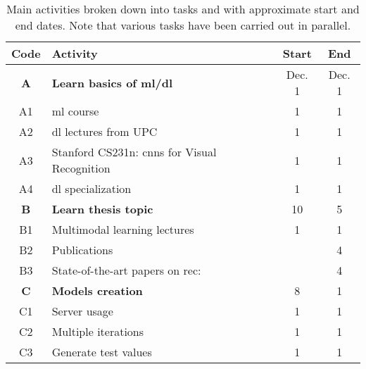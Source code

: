 \begin{table}[p]
  \centering
  \caption[Main activities broken down into tasks]{Main activities broken down
    into tasks and with approximate start and end dates. Note that various
    tasks have been carried out in parallel.}\label{tab:activities}
  \begin{tabular}{cp{}cc}
    \toprule
    \rowcolor{gray!37.5}
    \textbf{Code} & \textbf{Activity} & \textbf{Start} & \textbf{End} \\
    \midrule

    \rowcolor{rowColor}
    \textbf{A} & \textbf{Learn basics of \acs{ml}/\acs{dl}}                                      & Dec. 1 & Dec. 1 \\
    \rowcolor{rowColor}
    A1         & \Acs{ml} course \cite{ng20:machin_learn}                                        & 1      & 1      \\
    \rowcolor{rowColor}
    A2         & \Acs{dl} lectures from UPC \cite{giro-i-nieto20:all_deep_learn_upc_etset_telec} & 1      & 1      \\
    \rowcolor{rowColor}
    A3         & Stanford CS231n: \acsp{cnn} for Visual Recognition \cite{li20:cs231}            & 1      & 1      \\
    \rowcolor{rowColor}
    A4         & \Acs{dl} specialization \cite{ng20:deep_learn_special}                          & 1      & 1      \\
    \midrule

    \textbf{B} & \textbf{Learn thesis topic}                                                       & 10 & 5 \\
    B1         & Multimodal learning lectures \cite{giro-i-nieto20:all_deep_learn_upc_etset_telec} & 1  & 1 \\
    B2         & Publications                                                                      &    & 4 \\
    B3         & State-of-the-art papers on \acs{rec}: \cite{}                                     &    & 4 \\
    \midrule

    \rowcolor{rowColor}
    \textbf{C} & \textbf{Models creation}    & 8 & 1 \\
    \rowcolor{rowColor}
    C1         & Server usage         & 1 & 1 \\
    \rowcolor{rowColor}
    C2         & Multiple iterations  & 1 & 1 \\
    \rowcolor{rowColor}
    C3         & Generate test values & 1 & 1 \\
    \midrule


\end{tabular}
\end{table}
